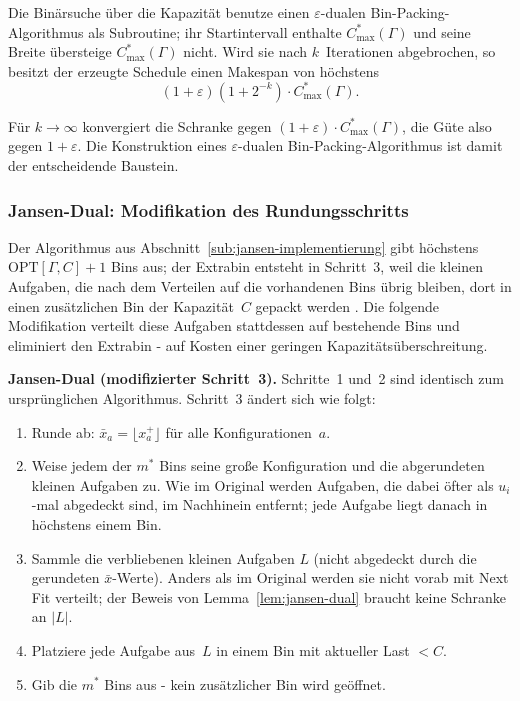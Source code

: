 \begin{theorem}
\label{thm:hs-makespan}
  Die Binärsuche über die Kapazität benutze einen $\varepsilon$-dualen Bin-Packing-Algorithmus als
  Subroutine; ihr Startintervall enthalte $C^{*}_{\max}(\Gamma)$ und seine Breite übersteige
  $C^{*}_{\max}(\Gamma)$ nicht.
  Wird sie nach $k$~Iterationen abgebrochen, so besitzt der erzeugte Schedule einen Makespan von
  höchstens
  \[
    (1 + \varepsilon)(1 + 2^{-k})\cdot C^{*}_{\max}(\Gamma).
  \]
\end{theorem}

Für $k \to \infty$ konvergiert die Schranke gegen $(1+\varepsilon)\cdot C^{*}_{\max}(\Gamma)$,
die Güte also gegen $1+\varepsilon$.
Die Konstruktion eines $\varepsilon$-dualen Bin-Packing-Algorithmus ist damit der entscheidende Baustein.

\subsubsection{Jansen-Dual: Modifikation des Rundungsschritts}

Der Algorithmus aus Abschnitt~\ref{sub:jansen-implementierung} gibt höchstens $\mathrm{OPT}[\Gamma, C]+1$
Bins aus; der Extrabin entsteht in Schritt~3, weil die kleinen Aufgaben, die nach dem Verteilen
auf die vorhandenen Bins übrig bleiben, dort in einen zusätzlichen Bin der Kapazität~$C$ gepackt
werden \cite{jansen_solisoba2010}.
Die folgende Modifikation verteilt diese Aufgaben stattdessen auf bestehende Bins und eliminiert
den Extrabin - auf Kosten einer geringen Kapazitätsüberschreitung.

\medskip\noindent
\textbf{Jansen-Dual (modifizierter Schritt~3).}
Schritte~1 und~2 sind identisch zum ursprünglichen Algorithmus.
Schritt~3 ändert sich wie folgt:
\begin{enumerate}[label=\arabic*.]
  \item Runde ab: $\bar{x}_{a} = \lfloor x^+_{a} \rfloor$ für alle Konfigurationen~$a$.
  \item Weise jedem der $m^*$ Bins seine große Konfiguration und die abgerundeten kleinen
        Aufgaben zu. Wie im Original werden Aufgaben, die dabei öfter als $u_i$-mal abgedeckt
        sind, im Nachhinein entfernt; jede Aufgabe liegt danach in höchstens einem Bin.
  \item Sammle die verbliebenen kleinen Aufgaben $L$ (nicht abgedeckt durch die gerundeten $\bar{x}$-Werte).
        Anders als im Original werden sie nicht vorab mit Next Fit verteilt; der Beweis von
        Lemma~\ref{lem:jansen-dual} braucht keine Schranke an $|L|$.
  \item Platziere jede Aufgabe aus~$L$ in einem Bin mit aktueller Last $< C$.
  \item Gib die $m^*$ Bins aus - kein zusätzlicher Bin wird geöffnet.
\end{enumerate}

